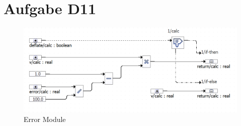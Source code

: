 
\chapter{Aufgabe D11}

\begin{figure}[h!]
	\centering
	\includegraphics[width=1\linewidth]{../Graphiken/ErrorModule.png}
	\caption{Error Module}
	\label{fig:ErrorModule}
\end{figure}
